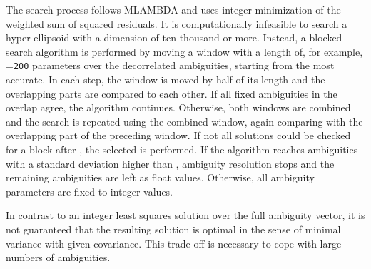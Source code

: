 The search process follows MLAMBDA and uses integer minimization of the weighted sum of squared residuals.
It is computationally infeasible to search a hyper-ellipsoid with a dimension of ten thousand or more.
Instead, a blocked search algorithm is performed by moving a window with a length of, for example,
=\verb|200| parameters over the decorrelated ambiguities, starting from the most accurate.
In each step, the window is moved by half of its length and the overlapping parts are compared to each other.
If all fixed ambiguities in the overlap agree, the algorithm continues.
Otherwise, both windows are combined and the search is repeated using the combined window, again comparing with the overlapping
part of the preceding window. If not all solutions could be checked for a block after ,
the selected  is performed.
If the algorithm reaches ambiguities with a standard deviation higher than ,
ambiguity resolution stops and the remaining ambiguities are left as float values.
Otherwise, all ambiguity parameters are fixed to integer values.

In contrast to an integer least squares solution over the full ambiguity vector, it is not guaranteed that the resulting solution
is optimal in the sense of minimal variance with given covariance.
This trade-off is necessary to cope with large numbers of ambiguities.


